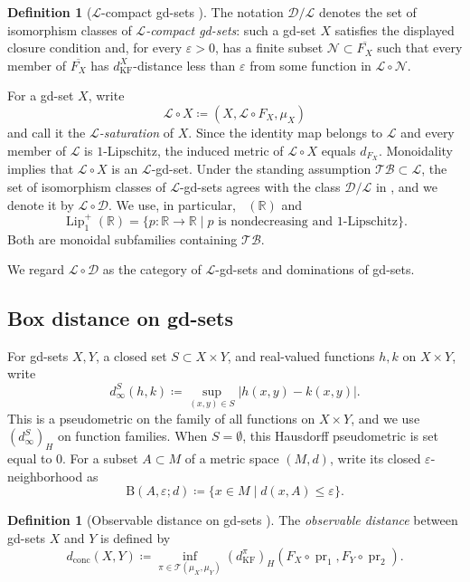 \documentclass{amsart}
\theoremstyle{plain}
\theoremstyle{definition}
\newtheorem{definition}[theorem]{Definition}
\newtheorem*{definition*}{Definition}
\theoremstyle{remark}
\newcommand{\R}{\mathbb{R}}
\newcommand{\D}{\mathcal{D}}
\renewcommand{\L}{\mathcal{L}}
\newcommand{\TB}{\mathcal{TB}}
\newcommand{\Lup}{\operatorname{Lip}^{+}_{1}(\R)}
\DeclareMathOperator{\lipone}{Lip_1}
\DeclareMathOperator{\pr}{pr}
\newcommand{\dconc}{d_{\operatorname{conc}}}
\newcommand{\kf}{d_{\operatorname{KF}}}
\newcommand{\dinf}[1]{d^{#1}_{\infty}}
\newcommand{\haus}[1]{\left(#1\right)_H}
\newcommand{\Tplan}{\mathcal{T}}
\begin{document}
\begin{definition*}[$\L$-compact gd-sets {\cite[Definitions~3.3, 3.5, and~3.8]{gds2}}]
The notation $\D/\L$ denotes the set of isomorphism classes of \emph{$\L$-compact gd-sets}: such a gd-set $X$ satisfies the displayed closure condition and, for every $\varepsilon>0$, has a finite subset $\mathcal N\subset\overline{F_X}$ such that every member of $\overline{F_X}$ has $\kf^X$-distance less than $\varepsilon$ from some function in $\L\circ\mathcal N$.
\end{definition*}
For a gd-set $X$, write
\[\L\circ X\coloneqq(X,\L\circ F_X,\mu_X)\]
and call it the \emph{$\L$-saturation} of $X$. Since the identity map belongs to $\L$ and every member of $\L$ is $1$-Lipschitz, the induced metric of $\L\circ X$ equals $d_{F_X}$. Monoidality implies that $\L\circ X$ is an $\L$-gd-set. Under the standing assumption $\TB\subset\L$, the set of isomorphism classes of $\L$-gd-sets agrees with the class $\D/\L$ in \cite[Theorem~3.19]{gds2}, and we denote it by $\L\circ\D$. We use, in particular, $\lipone(\R)$ and
\[\Lup=\{p\colon\R\to\R\mid p\text{ is nondecreasing and $1$-Lipschitz}\}.\]
Both are monoidal subfamilies containing $\TB$.

We regard $\L\circ\D$ as the category of $\L$-gd-sets and dominations of gd-sets.

\subsection{Box distance on gd-sets}

For gd-sets $X,Y$, a closed set $S\subset X\times Y$, and real-valued functions $h,k$ on $X\times Y$, write
\[\dinf{S}(h,k)\coloneqq\sup_{(x,y)\in S}|h(x,y)-k(x,y)|.\]
This is a pseudometric on the family of all functions on $X\times Y$, and we use $\haus{\dinf{S}}$ on function families. When $S=\emptyset$, this Hausdorff pseudometric is set equal to $0$. For a subset $A\subset M$ of a metric space $(M,d)$, write its closed $\varepsilon$-neighborhood as
\[\mathrm B(A,\varepsilon;d)\coloneqq\{x\in M\mid d(x,A)\leq\varepsilon\}.\]

\begin{definition}[Observable distance on gd-sets {\cite[Theorem~4.6]{gds1}}]
\label{def:gds-distances}
The \emph{observable distance} between gd-sets $X$ and $Y$ is defined by
\begin{equation}
\label{eq:gds-dconc}
\dconc(X,Y)\coloneqq\inf_{\pi\in\Tplan(\mu_X,\mu_Y)}\haus{\kf^\pi}(F_X\circ\pr_1,F_Y\circ\pr_2).
\end{equation}
\end{definition}
\end{document}

